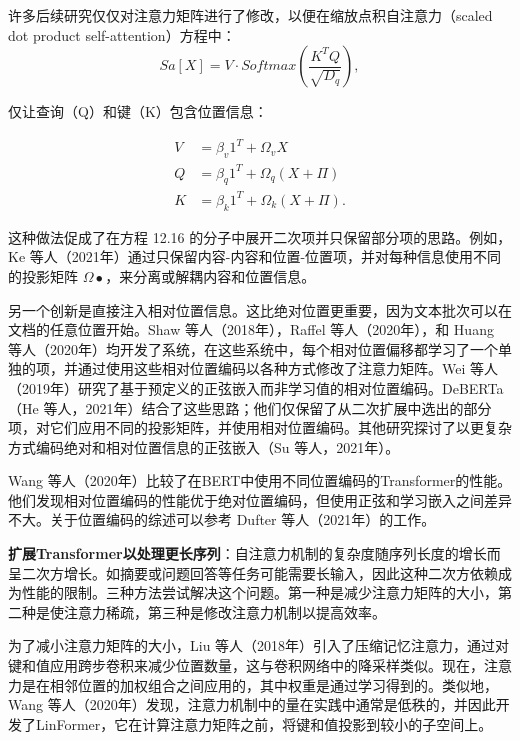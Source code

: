 许多后续研究仅仅对注意力矩阵进行了修改，以便在缩放点积自注意力（scaled dot product self-attention）方程中：
\begin{equation}
Sa[X] = V \cdot Softmax\left( \frac{K^TQ}{\sqrt{D_q}} \right),  
\end{equation}

仅让查询（Q）和键（K）包含位置信息：


\begin{align}
V &= \beta_v 1^T + \Omega_v X \\
Q &= \beta_q 1^T + \Omega_q (X + \Pi) \\
K &= \beta_k 1^T + \Omega_k (X + \Pi). 
\end{align} 

这种做法促成了在方程 12.16 的分子中展开二次项并只保留部分项的思路。例如，Ke 等人（2021年）通过只保留内容-内容和位置-位置项，并对每种信息使用不同的投影矩阵 \(\Omega •\)，来分离或解耦内容和位置信息。

另一个创新是直接注入相对位置信息。这比绝对位置更重要，因为文本批次可以在文档的任意位置开始。Shaw 等人（2018年），Raffel 等人（2020年），和 Huang 等人（2020年）均开发了系统，在这些系统中，每个相对位置偏移都学习了一个单独的项，并通过使用这些相对位置编码以各种方式修改了注意力矩阵。Wei 等人（2019年）研究了基于预定义的正弦嵌入而非学习值的相对位置编码。DeBERTa（He 等人，2021年）结合了这些思路；他们仅保留了从二次扩展中选出的部分项，对它们应用不同的投影矩阵，并使用相对位置编码。其他研究探讨了以更复杂方式编码绝对和相对位置信息的正弦嵌入（Su 等人，2021年）。

Wang 等人（2020年）比较了在BERT中使用不同位置编码的Transformer的性能。他们发现相对位置编码的性能优于绝对位置编码，但使用正弦和学习嵌入之间差异不大。关于位置编码的综述可以参考 Dufter 等人（2021年）的工作。

\textbf{扩展Transformer以处理更长序列}：自注意力机制的复杂度随序列长度的增长而呈二次方增长。如摘要或问题回答等任务可能需要长输入，因此这种二次方依赖成为性能的限制。三种方法尝试解决这个问题。第一种是减少注意力矩阵的大小，第二种是使注意力稀疏，第三种是修改注意力机制以提高效率。

为了减小注意力矩阵的大小，Liu 等人（2018年）引入了压缩记忆注意力，通过对键和值应用跨步卷积来减少位置数量，这与卷积网络中的降采样类似。现在，注意力是在相邻位置的加权组合之间应用的，其中权重是通过学习得到的。类似地，Wang 等人（2020年）发现，注意力机制中的量在实践中通常是低秩的，并因此开发了LinFormer，它在计算注意力矩阵之前，将键和值投影到较小的子空间上。

